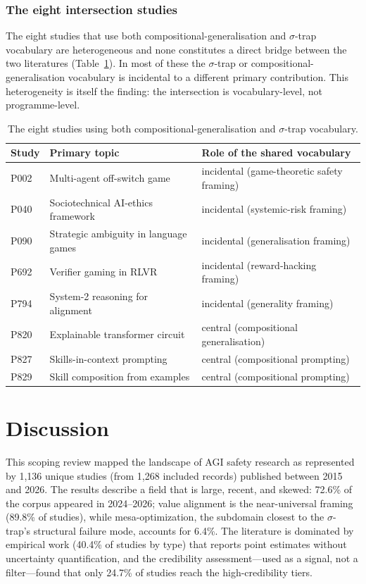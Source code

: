 \subsubsection{The eight intersection studies}
The eight studies that use both compositional-generalisation and $\sigma$-trap vocabulary are heterogeneous and none constitutes a direct bridge between the two literatures (Table~\ref{tab:intersection}). In most of these the $\sigma$-trap or compositional-generalisation vocabulary is incidental to a different primary contribution. This heterogeneity is itself the finding: the intersection is vocabulary-level, not programme-level.

\begin{table}[htbp]
\centering
\caption{The eight studies using both compositional-generalisation and $\sigma$-trap vocabulary.}
\label{tab:intersection}
\begin{tabular}{lll}
\toprule
Study & Primary topic & Role of the shared vocabulary \\
\midrule
P002 & Multi-agent off-switch game & incidental (game-theoretic safety framing) \\
P040 & Sociotechnical AI-ethics framework & incidental (systemic-risk framing) \\
P090 & Strategic ambiguity in language games & incidental (generalisation framing) \\
P692 & Verifier gaming in RLVR & incidental (reward-hacking framing) \\
P794 & System-2 reasoning for alignment & incidental (generality framing) \\
P820 & Explainable transformer circuit & central (compositional generalisation) \\
P827 & Skills-in-context prompting & central (compositional prompting) \\
P829 & Skill composition from examples & central (compositional prompting) \\
\bottomrule
\end{tabular}
\end{table}

\section{Discussion}\label{sec:discussion}

This scoping review mapped the landscape of AGI safety research as represented by 1,136 unique studies (from 1,268 included records) published between 2015 and 2026. The results describe a field that is large, recent, and skewed: 72.6\% of the corpus appeared in 2024--2026; value alignment is the near-universal framing (89.8\% of studies), while mesa-optimization, the subdomain closest to the $\sigma$-trap's structural failure mode, accounts for 6.4\%. The literature is dominated by empirical work (40.4\% of studies by type) that reports point estimates without uncertainty quantification, and the credibility assessment---used as a signal, not a filter---found that only 24.7\% of studies reach the high-credibility tiers.

